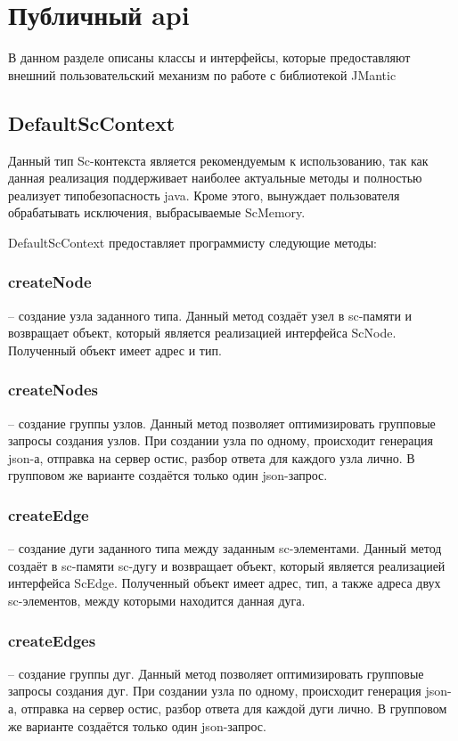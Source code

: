 \section{Публичный api}
В данном разделе описаны классы и интерфейсы, которые предоставляют внешний пользовательский механизм по работе с библиотекой JMantic


\subsection{DefaultScContext}
Данный тип Sc-контекста является рекомендуемым к использованию, так как данная реализация поддерживает наиболее актуальные методы и полностью реализует типобезопасность java. Кроме этого, вынуждает пользователя обрабатывать исключения, выбрасываемые ScMemory. 


DefaultScContext предоставляет программисту следующие методы:

\subsubsection{createNode} -- создание узла заданного типа. Данный метод создаёт узел в sc-памяти и возвращает объект, который является реализацией интерфейса ScNode. Полученный объект имеет адрес и тип.
\subsubsection {createNodes} -- создание группы узлов. Данный метод позволяет оптимизировать групповые запросы создания узлов. При создании узла по одному, происходит генерация json-а, отправка на сервер остис, разбор ответа для каждого узла лично. В групповом же варианте создаётся только один json-запрос. 
\subsubsection {createEdge} -- создание дуги заданного типа между заданным sc-элементами. Данный метод создаёт в sc-памяти sc-дугу и возвращает объект, который является реализацией интерфейса ScEdge. Полученный объект имеет адрес, тип, а также адреса двух sc-элементов, между которыми находится данная дуга.
\subsubsection {createEdges} -- создание группы дуг. Данный метод позволяет оптимизировать групповые запросы создания дуг. При создании узла по одному, происходит генерация json-а, отправка на сервер остис, разбор ответа для каждой дуги лично. В групповом же варианте создаётся только один json-запрос. 
